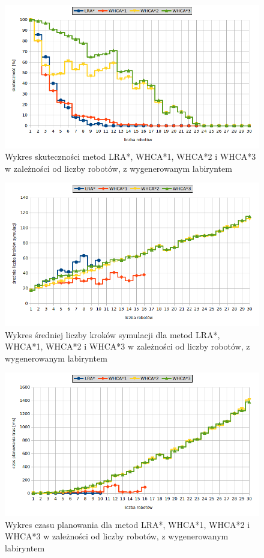\begin{figure}
	\centering
	\includegraphics[width=0.8\columnwidth]{img/plots/test-steps-maze-robots-eff}
	\caption{Wykres skuteczności metod LRA*, WHCA*1, WHCA*2 i WHCA*3 w zależności od liczby robotów, z wygenerowanym labiryntem}
	\label{fig:test-steps-maze-robots-eff}
\end{figure}
\begin{figure}
	\centering
	\includegraphics[width=0.8\columnwidth]{img/plots/test-steps-maze-robots-steps}
	\caption{Wykres średniej liczby kroków symulacji dla metod LRA*, WHCA*1, WHCA*2 i WHCA*3 w zależności od liczby robotów, z wygenerowanym labiryntem}
	\label{fig:test-steps-maze-robots-steps}
\end{figure}
\begin{figure}
	\centering
	\includegraphics[width=0.8\columnwidth]{img/plots/test-steps-maze-robots-calctime}
	\caption{Wykres czasu planowania dla metod LRA*, WHCA*1, WHCA*2 i WHCA*3 w zależności od liczby robotów, z wygenerowanym labiryntem}
	\label{fig:test-steps-maze-robots-calctime}
\end{figure}
